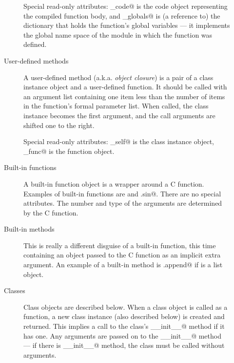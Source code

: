 \begin{description}
\begin{description}
Special read-only attributes: \verb@func_code@ is the code object
representing the compiled function body, and \verb@func_globals@ is (a
reference to) the dictionary that holds the function's global
variables --- it implements the global name space of the module in
which the function was defined.

\item[User-defined methods]
A user-defined method (a.k.a. {\em object closure}) is a pair of a
class instance object and a user-defined function.  It should be
called with an argument list containing one item less than the number
of items in the function's formal parameter list.  When called, the
class instance becomes the first argument, and the call arguments are
shifted one to the right.

Special read-only attributes: \verb@im_self@ is the class instance
object, \verb@im_func@ is the function object.

\item[Built-in functions]
A built-in function object is a wrapper around a C function.  Examples
of built-in functions are \verb@len@ and \verb@math.sin@.  There
are no special attributes.  The number and type of the arguments are
determined by the C function.

\item[Built-in methods]
This is really a different disguise of a built-in function, this time
containing an object passed to the C function as an implicit extra
argument.  An example of a built-in method is \verb@list.append@ if
\verb@list@ is a list object.

\item[Classes]
Class objects are described below.  When a class object is called as a
function, a new class instance (also described below) is created and
returned.  This implies a call to the class's \verb@__init__@ method
if it has one.  Any arguments are passed on to the \verb@__init__@
method --- if there is \verb@__init__@ method, the class must be called
without arguments.

\end{description}


\end{description}
